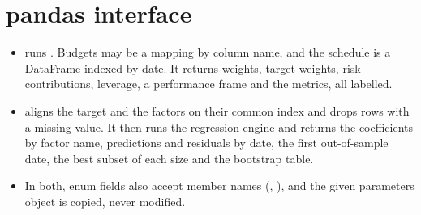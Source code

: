 \section{pandas interface}
\begin{itemize}
  \item {}
        runs . Budgets may be a mapping by column name, and
        the schedule is a DataFrame indexed by date. It returns weights, target weights,
        risk contributions, leverage, a performance frame and the metrics, all labelled.
  \item {} aligns the
        target and the factors on their common index and drops rows with a missing value.
        It then runs the regression engine and returns the coefficients by factor name,
        predictions and residuals by date, the first out-of-sample date, the best subset
        of each size and the bootstrap table.
  \item In both, enum fields also accept member names (,
        ), and the given parameters object is copied, never
        modified.
\end{itemize}
\begin{codepointers}
\end{codepointers}

